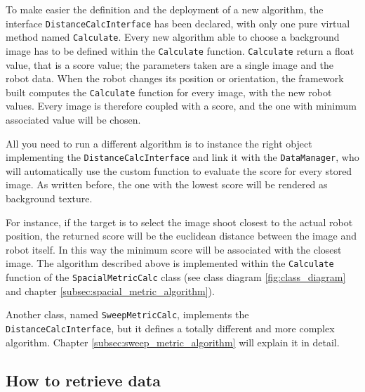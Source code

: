 %
To make easier the definition and the deployment of a new algorithm, the interface
\texttt{DistanceCalcInterface} has been declared, with only one pure virtual method named
\texttt{Calculate}. Every new algorithm able to choose a background image has to be defined
within the \texttt{Calculate} function.
\texttt{Calculate} return a float value, that is a score value; the parameters taken are a
single image and the robot data. When the robot changes its position or orientation, the
framework built computes the \texttt{Calculate} function for every image, with the new robot
values. Every image is therefore coupled with a score, and the one with minimum associated value
will be chosen.
%

%
All you need to run a different algorithm is to instance the right object implementing the
\texttt{DistanceCalcInterface} and link it with the \texttt{DataManager}, who will automatically
use the custom function to evaluate the score for every stored image. As written before, the
one with the lowest score will be rendered as background texture.
%

%
For instance, if the target is to select the image shoot closest to the actual robot position,
the returned score will be the euclidean distance between the image and robot itself. In this way
the minimum score will be associated with the closest image.
The algorithm described above is implemented within the \texttt{Calculate} function of the
\texttt{SpacialMetricCalc} class (see class diagram \ref{fig:class_diagram} and chapter
\ref{subsec:spacial_metric_algorithm}).
%

%
Another class, named \texttt{SweepMetricCalc}, implements the
\newline
\texttt{DistanceCalcInterface}, but it defines a totally different and more complex algorithm.
Chapter \ref{subsec:sweep_metric_algorithm} will explain it in detail.

\subsection{How to retrieve data}
\label{sub:howretrievedata}

